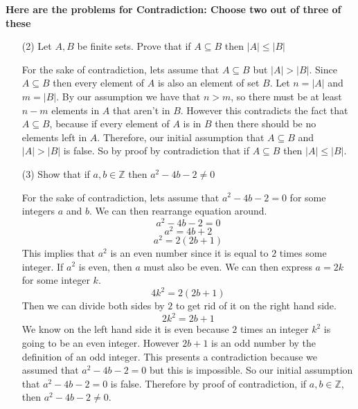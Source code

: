 \documentclass[answers,12pt]{exam}
\newcommand{\br}{\hfill \break}
\newcommand{\Z}{\mathbb{Z}}
\newcommand{\bs}{\begin{solution}}
\newcommand{\es}{\end{solution}}
\begin{document}
\br
\textbf{Here are the problems for Contradiction: Choose two out of three of these}
\begin{enumerate}    
    \item [(2)] Let \(A, B\) be finite sets. Prove that if \(A \subseteq B\) then \(|A| \le |B|\)
    \bs
    For the sake of contradiction, lets assume that \(A \subseteq B\) but \(|A| > |B|\). Since \(A \subseteq B\) then every element of \(A\) is also an element of set \(B\). Let \(n = |A|\) and \(m = |B|\). By our assumption we have that \(n > m\), so there must be at least \(n - m \) elements in \(A\) that aren't in \(B\). However this contradicts the fact that \(A \subseteq B\), because if every element of \(A\) is in \(B\) then there should be no elements left in \(A\). Therefore, our initial assumption that  \(A \subseteq B\) and \(|A| > |B|\) is false. So by proof by contradiction that if \(A \subseteq B\) then \(|A| \le |B|\).
    \es
    \item [(3)] Show that if \(a, b \in \Z\) then \(a^2 - 4b - 2 \ne 0\)
    \bs
    For the sake of contradiction, lets assume that \(a^2-4b-2 = 0\) for some integers \(a\) and \(b\). We can then rearrange equation around.
    \[a^2-4b-2=0\]
    \[a^2=4b+2\]
    \[a^2=2(2b+1)\]
    This implies that \(a^2\) is an even number since it is equal to \(2\) times some integer. If \(a^2\) is even, then \(a\) must also be even. We can then express \(a = 2k\) for some integer \(k\).
    \[4k^2 = 2(2b+1)\]
    Then we can divide both sides by \(2\) to get rid of it on the right hand side.
    \[2k^2 = 2b+1\]
    We know on the left hand side it is even because \(2\) times an integer \(k^2\) is going to be an even integer. However \(2b+1\) is an odd number by the definition of an odd integer. This presents a contradiction because we assumed that \(a^2-4b-2 = 0\) but this is impossible. So our initial assumption that \(a^2-4b-2=0\) is false. Therefore by proof of contradiction, if \(a,b \in \mathbb{Z}\), then \(a^2-4b-2 \neq 0\).
    \es
\end{enumerate}
\end{document}
